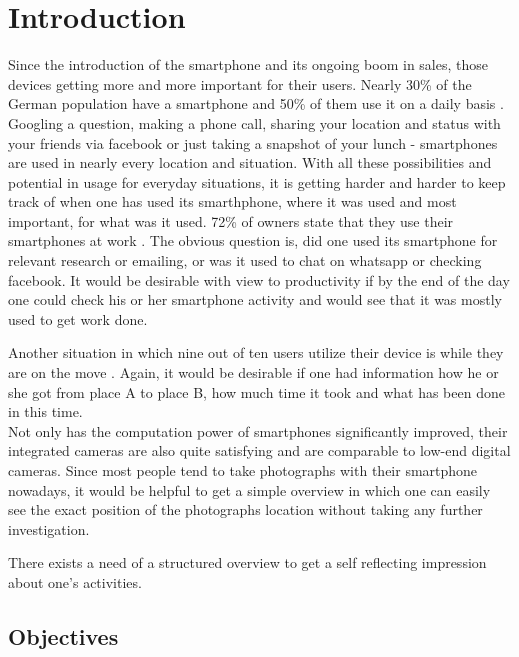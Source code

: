 \chapter{Introduction}
\label{cha:introduction}

Since  the introduction of the smartphone and its ongoing boom in sales, those devices getting more and more important for their users.
Nearly 30\% of the German population have a smartphone and 50\% of them use it on a daily basis \cite{gstatistic}. Googling a question, making a phone call, sharing your location and status with your friends via facebook or just taking a snapshot of your lunch - smartphones are used in nearly every location and situation. With all these possibilities and potential in usage for everyday situations, it is getting harder and harder to keep track of when one has used its smarthphone, where it was used and most important, for what was it used. 72\% of owners state that they use their smartphones at work \cite{gstatistic}. The obvious question is, did one used its smartphone for relevant research or emailing, or was it used to chat on whatsapp or checking facebook. It would be desirable with view to productivity if by the end of the day one could check his or her smartphone activity and would see that it was mostly used to get work done.

Another  situation in which nine out of ten users utilize their device is while they are on the move \cite{gstatistic}. Again, it would be desirable if one had information how he or she got from place A to place B, how much time it took and what has been done in this time.\\
Not only has the computation power of smartphones significantly improved, their integrated cameras are also quite satisfying and are comparable to low-end digital cameras.
Since most people tend to take photographs with their smartphone nowadays, it would be helpful to get a simple overview in which one can easily see the exact position of the photographs location without taking any further investigation.

There exists a need of a structured overview to get a self reflecting impression about one's activities.
\section{Objectives}
\label{sec:objectives}

